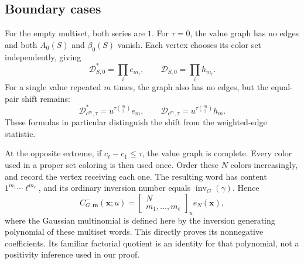 \documentclass[11pt,reqno]{amsart}
\newcommand{\xx}{\mathbf x}
\newcommand{\mm}{\mathbf m}
\newcommand{\DD}{\mathcal D}
\newcommand{\inv}{\operatorname{inv}}
\theoremstyle{definition}
\theoremstyle{remark}
\numberwithin{equation}{section}
\begin{document}
\subsection{Boundary cases}
For the empty multiset, both series are $1$.  For $\tau=0$, the value
graph has no edges and both $A_0(S)$ and $\beta_0(S)$ vanish.  Each
vertex chooses its color set independently, giving
\begin{equation}\label{eq:step-zero}
 \DD^*_{S,0}=\prod_i e_{m_i},\qquad
 \DD_{S,0}=\prod_i h_{m_i}.
\end{equation}
For a single value repeated $m$ times, the graph also has no edges,
but the equal-pair shift remains:
\begin{equation}\label{eq:one-value}
 \DD^*_{c^m,\tau}=u^{\tau\binom m2}e_m,\qquad
 \DD_{c^m,\tau}=u^{\tau\binom m2}h_m.
\end{equation}
These formulas in particular distinguish the shift from the
weighted-edge statistic.

At the opposite extreme, if $c_\ell-c_1\leq\tau$, the value graph
is complete.  Every color used in a proper set coloring is then used
once.  Order these $N$ colors increasingly, and record the vertex
receiving each one.  The resulting word has content
$1^{m_1}\cdots\ell^{m_\ell}$, and its ordinary inversion number equals
$\inv_G(\gamma)$.  Hence
\begin{equation}\label{eq:complete}
 C^-_{G,\mm}(\xx;u)
   =\begin{bmatrix}N\\m_1,\ldots,m_\ell\end{bmatrix}_u e_N(\xx),
\end{equation}
where the Gaussian multinomial is defined here by the inversion
generating polynomial of these multiset words.  This directly proves
its nonnegative coefficients.  Its familiar factorial quotient is an
identity for that polynomial, not a positivity inference used in
our proof.
\end{document}
